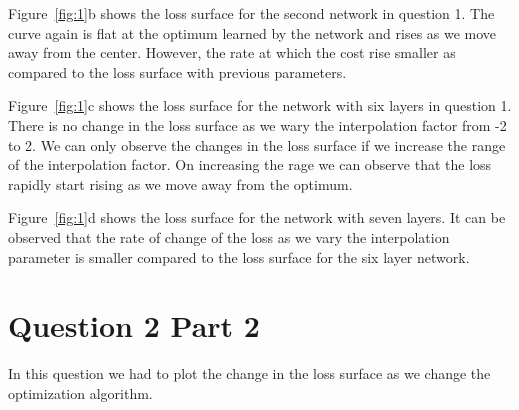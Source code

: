 \documentclass[12pt]{report}
\begin{document}
Figure~\ref{fig:1}b shows the loss surface for the second network in question 1. The curve again is flat at the optimum learned by the network and rises as we move away from the center. However, the rate at which the cost rise smaller as compared to the loss surface with previous parameters. 



Figure~\ref{fig:1}c shows the loss surface for the network with six layers in question 1. There is no change in the loss surface as we wary the interpolation factor from -2 to 2. We can only observe the changes in the loss surface if we increase the range of the interpolation factor. On increasing the rage we can observe that the loss rapidly start rising as we move away from the optimum. 

Figure~\ref{fig:1}d shows the loss surface for the network with seven layers. It can be observed that the rate of change of the loss as we vary the interpolation parameter is smaller compared to the loss surface for the six layer network.	 

\section*{Question 2 Part 2}
In this question we had to plot the change in the loss surface as we change the optimization algorithm.
\end{document}
